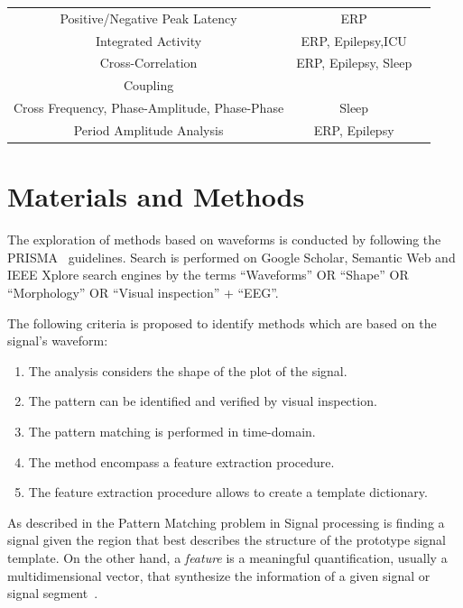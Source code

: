 \documentclass[brainsci,article,accept,moreauthors,pdftex,10pt,a4paper]{mdpi}
\begin{document}
\begin{table}[H]
\begin{tabular}{ccc}
Positive/Negative Peak Latency                                 & ERP  & \citep{Mak2012}  \\
Integrated Activity               & ERP, Epilepsy,ICU & \citep{Wulsin2011,Uchida1999, Shah2015} \\
Cross-Correlation                & ERP, Epilepsy, Sleep & \citep{Cacioppo2007, Shah2015} \\
Coupling \\ Cross Frequency,  Phase-Amplitude, Phase-Phase     & Sleep & \citep{Cole2017} \\
Period Amplitude Analysis  & ERP, Epilepsy & \citep{Uchida1999,Cacioppo2007, Shah2015} \\
\bottomrule
\end{tabular}
\label{tab:methods}
\end{table}


\section{Materials and Methods}

The exploration of methods based on waveforms is conducted by following the PRISMA~\citep{Moher2009} guidelines.  Search is performed on Google Scholar, Semantic Web and IEEE Xplore search engines by the terms ``Waveforms'' OR ``Shape'' OR ``Morphology'' OR ``Visual inspection'' + ``EEG''.

The following criteria is proposed to identify methods which are based on the signal's waveform:

\begin{enumerate}[leftmargin=*,labelsep=4.9mm]
\item The analysis considers the shape of the plot of the signal.
\item The pattern can be identified and verified by visual inspection.
\item The pattern matching is performed in time-domain.
\item The method encompass a feature extraction procedure.
\item The feature extraction procedure allows to create a template dictionary.
\end{enumerate}

As described in \citep{allen2004signal} the Pattern Matching problem in Signal processing is finding a signal given the region that best describes the structure of the prototype signal template.   On the other hand, a \textit{feature} is a meaningful quantification, usually a multidimensional vector, that synthesize the information of a given signal or signal segment~\citep{WolpawJonathanR2012}.   
\end{document}
